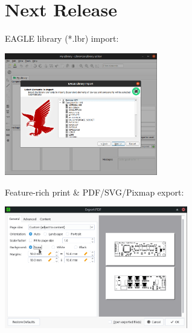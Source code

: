 \section{Next Release}

\begin{frame}{\secname}

  EAGLE library (*.lbr) import:

  \begin{center}
    \includegraphics[width=0.5\textwidth]{images/eagle_import.png}
  \end{center}

\end{frame}

\begin{frame}[noframenumbering]{\secname}

  Feature-rich print \& PDF/SVG/Pixmap export:

  \begin{center}
    \includegraphics[width=0.6\textwidth]{images/pdf_export.png}
  \end{center}

\end{frame}
